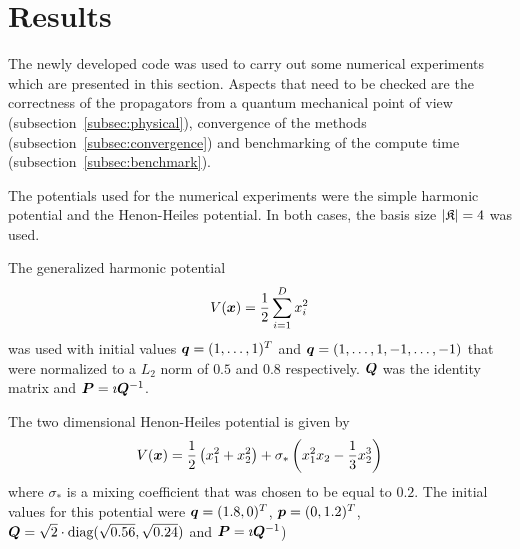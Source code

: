 \section{Results}
\label{sec:results}
%
The newly developed code was used to carry out some numerical experiments which are presented in this section.
Aspects that need to be checked are the correctness of the propagators from a quantum mechanical point of view (subsection~\ref{subsec:physical}), convergence of the methods (subsection~\ref{subsec:convergence}) and benchmarking of the compute time (subsection~\ref{subsec:benchmark}).
\par\medskip
%
The potentials used for the numerical experiments were the simple harmonic potential and the Henon-Heiles potential.
In both cases, the basis size $| \mathfrak{K} | = 4$ was used.
\par\medskip
%
The generalized harmonic potential
\begin{align}
	\label{math:harmonic}
	V(\bm{x}) = \frac{1}{2} \sum_{i=1}^D x_i^2
\end{align}
%
was used with initial values $\bm{q} = (1,\dots,1)^T$ and $\bm{q} = (1,\dots,1,-1,\dots,-1)$ that were normalized to a $L_2$ norm of $0.5$ and $0.8$ respectively.
$\bm{Q}$ was the identity matrix and $\bm{P} = \imath \bm{Q}^{-1}$. \\
\par\medskip
%
The two dimensional Henon-Heiles potential is given by
%
\begin{align}
	\label{math:henonheiles}
	V(\bm{x}) = \frac{1}{2} \left( x_1^2 + x_2^2 \right) + \sigma_* \left( x_1^2 x_2 - \frac{1}{3} x_2^3 \right)
\end{align}
%
where $\sigma_*$ is a mixing coefficient that was chosen to be equal to $0.2$.
The initial values for this potential were $\bm{q}=(1.8,0)^T$, $ \bm{p}=(0,1.2)^T$, $\bm{Q} = \sqrt{2} \cdot \text{diag}( \sqrt{0.56}, \sqrt{0.24} )$ and $\bm{P} = \imath \bm{Q}^{-1}$)


